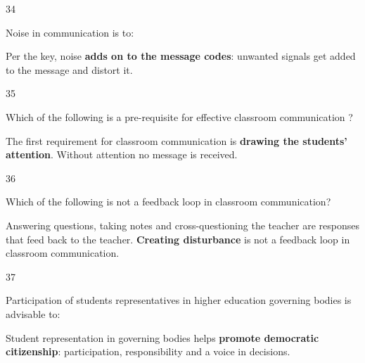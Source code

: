 \begin{question}{34}
{Noise in communication is to:\par}
\begin{explain}
Per the key, noise \textbf{adds on to the message codes}: unwanted signals get added to the message and distort it.
\end{explain}
\end{question}

\begin{question}{35}
{Which of the following is a pre-requisite for effective classroom communication ?\par}
\begin{explain}
The first requirement for classroom communication is \textbf{drawing the students' attention}. Without attention no message is received.
\end{explain}
\end{question}

\begin{question}{36}
{Which of the following is not a feedback loop in classroom communication?\par}
\begin{explain}
Answering questions, taking notes and cross-questioning the teacher are responses that feed back to the teacher. \textbf{Creating disturbance} is not a feedback loop in classroom communication.
\end{explain}
\end{question}

\begin{question}{37}
{Participation of students representatives in higher education governing bodies is advisable to:\par}
\begin{explain}
Student representation in governing bodies helps \textbf{promote democratic citizenship}: participation, responsibility and a voice in decisions.
\end{explain}
\end{question}

